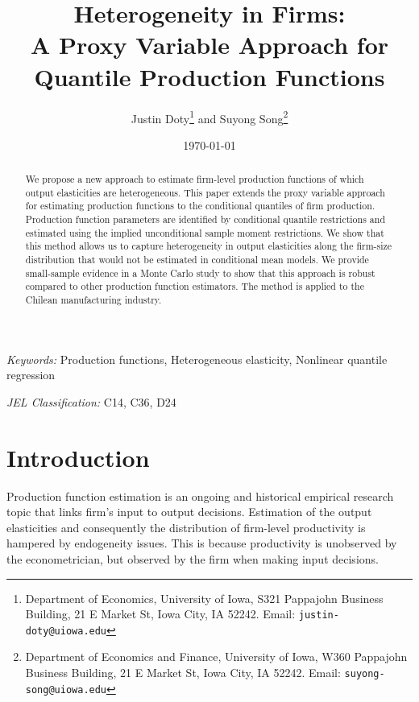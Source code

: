 \documentclass[11pt]{article}
\begin{document}
\title{Heterogeneity in Firms: \\
A Proxy Variable Approach for Quantile Production Functions
}

\author{Justin Doty\thanks{Department of Economics, University of Iowa, S321 Pappajohn Business Building, 21 E Market St, Iowa City, IA 52242. Email: \texttt{justin-doty@uiowa.edu}} and Suyong Song\thanks{Department of Economics and Finance, University of Iowa, W360 Pappajohn Business Building, 21 E Market St, Iowa City, IA 52242. Email: \texttt{suyong-song@uiowa.edu}}
}

\date {\today}
\maketitle


\begin{abstract}
We propose a new approach to estimate firm-level production functions of which output elasticities are heterogeneous. 
This paper extends the proxy variable approach for estimating production functions to the conditional quantiles of firm production. Production function parameters are identified by conditional quantile restrictions and estimated using the implied unconditional sample moment restrictions. We show that this method allows us to capture heterogeneity in output elasticities along the firm-size distribution that would not be estimated in conditional mean models. We provide small-sample evidence in a Monte Carlo study to show that this approach is robust compared to other production function estimators. The method is applied to the Chilean manufacturing industry.
\end{abstract}


\textit{Keywords:} Production functions, Heterogeneous elasticity, Nonlinear quantile regression

\textit{JEL Classification:} C14, C36, D24



\baselineskip25pt

\onehalfspacing

\section{Introduction}

Production function estimation is an ongoing and historical empirical research topic that links firm's input to output decisions. Estimation of the output elasticities and consequently the distribution of firm-level productivity is hampered by endogeneity issues. This is because productivity is unobserved by the econometrician, but observed by the firm when making input decisions. 
\end{document}
